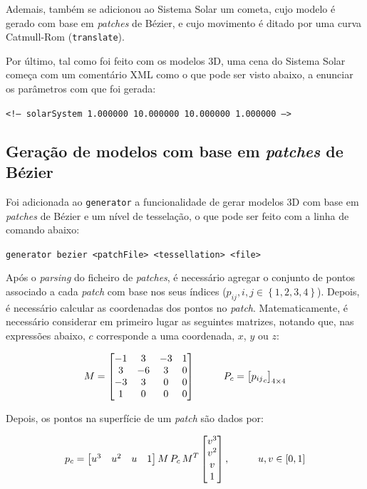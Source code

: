 \documentclass[12pt, a4paper]{article}
\begin{document}
Ademais, também se adicionou ao Sistema Solar um cometa, cujo modelo é gerado com base em
\emph{patches} de Bézier, e cujo movimento é ditado por uma curva Catmull-Rom (\texttt{translate}).

Por último, tal como foi feito com os modelos 3D, uma cena do Sistema Solar começa com um comentário
XML como o que pode ser visto abaixo, a enunciar os parâmetros com que foi gerada:

\begin{center}
    \texttt{<!-- solarSystem 1.000000 10.000000 10.000000 1.000000 -->}
\end{center}

\subsection{Geração de modelos com base em \emph{patches} de Bézier}

Foi adicionada ao \texttt{generator} a funcionalidade de gerar modelos 3D com base em \emph{patches}
de Bézier e um nível de tesselação, o que pode ser feito com a linha de comando abaixo:

\begin{center}
    \texttt{generator bezier <patchFile> <tessellation> <file>}
\end{center}

Após o \emph{parsing} do ficheiro de \emph{patches}, é necessário agregar o conjunto de pontos
associado a cada \emph{patch} com base nos seus índices
($p_{i j}, i, j \in \left \lbrace 1,2,3,4 \right \rbrace$). Depois, é necessário calcular as
coordenadas dos pontos no \emph{patch}. Matematicamente, é necessário considerar em primeiro lugar
as seguintes matrizes, notando que, nas expressões abaixo, $c$ corresponde a uma coordenada, $x$,
$y$ ou $z$:

$$
\def\arraystretch{1}
M =
\begin{bmatrix}
    -1 &  3 & -3 & 1 \\
     3 & -6 &  3 & 0 \\
    -3 &  3 &  0 & 0 \\
     1 &  0 &  0 & 0
\end{bmatrix}
\hspace{1cm}
P_c = \left [ {p_{i j}}_{c} \right ] _ {4 \times 4}
$$

Depois, os pontos na superfície de um \emph{patch} são dados por:

$$
\def\arraystretch{1}
p_c =
\begin{bmatrix}
    u^3 & u^2 & u & 1
\end{bmatrix}
M \, P_c \, M^T
\begin{bmatrix}
    v^3 \\ v^2 \\ v \\ 1
\end{bmatrix},
\hspace{1cm}
u, v \in \left [ 0, 1 \right ]
$$
\end{document}
